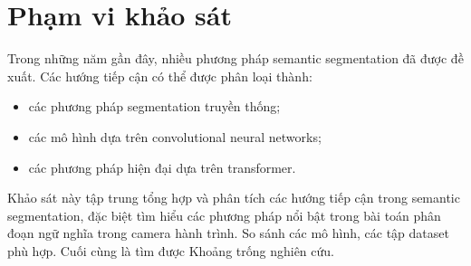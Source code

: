 \section{Phạm vi khảo sát}

Trong những năm gần đây, nhiều phương pháp semantic segmentation đã được đề xuất. Các hướng tiếp cận có thể được phân loại thành:
\begin{itemize}
\item các phương pháp segmentation truyền thống;
\item các mô hình dựa trên convolutional neural networks;
\item các phương pháp hiện đại dựa trên transformer.
\end{itemize}

Khảo sát này tập trung tổng hợp và phân tích các hướng tiếp cận trong semantic segmentation, đặc biệt tìm hiểu các phương pháp nổi bật trong bài toán phân đoạn ngữ nghĩa trong camera hành trình. So sánh các mô hình, các tập dataset phù hợp. Cuối cùng là tìm được Khoảng trống nghiên cứu.